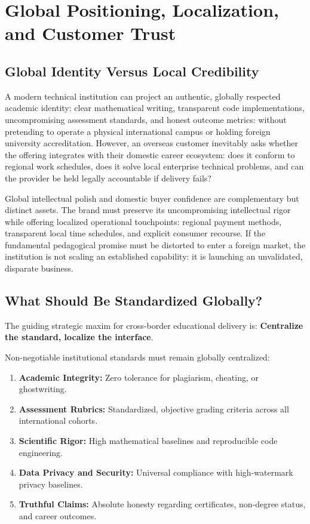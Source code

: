 \section{Global Positioning, Localization, and Customer Trust}
\label{sec:ch30_global_positioning_localization}

\subsection{Global Identity Versus Local Credibility}
\label{sec:global_identity_versus_local_credibility}

A modern technical institution can project an authentic, globally respected academic identity: clear mathematical writing, transparent code implementations, uncompromising assessment standards, and honest outcome metrics: without pretending to operate a physical international campus or holding foreign university accreditation. However, an overseas customer inevitably asks whether the offering integrates with their domestic career ecosystem: does it conform to regional work schedules, does it solve local enterprise technical problems, and can the provider be held legally accountable if delivery fails?

Global intellectual polish and domestic buyer confidence are complementary but distinct assets. The brand must preserve its uncompromising intellectual rigor while offering localized operational touchpoints: regional payment methods, transparent local time schedules, and explicit consumer recourse. If the fundamental pedagogical promise must be distorted to enter a foreign market, the institution is not scaling an established capability: it is launching an unvalidated, disparate business.

\subsection{What Should Be Standardized Globally?}
\label{sec:standardize_globally_localize_locally}

The guiding strategic maxim for cross-border educational delivery is: \textbf{Centralize the standard, localize the interface}.

Non-negotiable institutional standards must remain globally centralized:
\begin{enumerate}
\item \textbf{Academic Integrity:} Zero tolerance for plagiarism, cheating, or ghostwriting.
\item \textbf{Assessment Rubrics:} Standardized, objective grading criteria across all international cohorts.
\item \textbf{Scientific Rigor:} High mathematical baselines and reproducible code engineering.
\item \textbf{Data Privacy and Security:} Universal compliance with high-watermark privacy baselines.
\item \textbf{Truthful Claims:} Absolute honesty regarding certificates, non-degree status, and career outcomes.
\end{enumerate}

